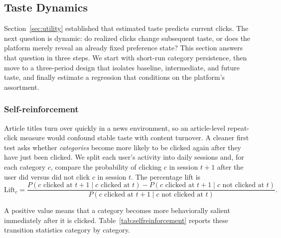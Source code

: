\documentclass[11pt]{article}
\begin{document}
\subsection{Taste Dynamics}
\label{sec:taste}

Section~\ref{sec:utility} established that estimated taste predicts current clicks. The next question is dynamic: do realized clicks change subsequent taste, or does the platform merely reveal an already fixed preference state? This section answers that question in three steps. We start with short-run category persistence, then move to a three-period design that isolates baseline, intermediate, and future taste, and finally estimate a regression that conditions on the platform's assortment.

\subsubsection{Self-reinforcement}

Article titles turn over quickly in a news environment, so an article-level repeat-click measure would confound stable taste with content turnover. A cleaner first test asks whether \emph{categories} become more likely to be clicked again after they have just been clicked. We split each user's activity into daily sessions and, for each category $c$, compare the probability of clicking $c$ in session $t+1$ after the user did versus did not click $c$ in session $t$. The percentage lift is
\[
\text{Lift}_c =
\frac{
P(c\text{ clicked at }t{+}1 \mid c\text{ clicked at }t)
-
P(c\text{ clicked at }t{+}1 \mid c\text{ not clicked at }t)
}{
P(c\text{ clicked at }t{+}1 \mid c\text{ not clicked at }t)
}.
\]

A positive value means that a category becomes more behaviorally salient immediately after it is clicked. Table~\ref{tab:selfreinforcement} reports these transition statistics category by category.
\end{document}
